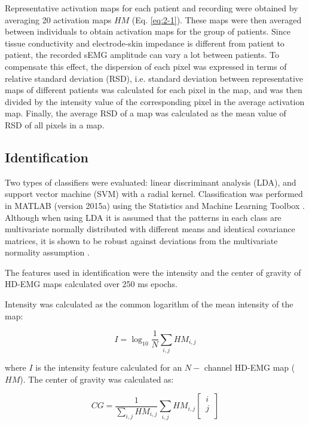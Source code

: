 Representative activation maps for each patient and recording were obtained by averaging 20 activation maps $HM$ (Eq. \ref{eq:2-1}). These maps were then averaged between individuals to obtain activation maps for the group of patients. Since tissue conductivity and electrode-skin impedance is different from patient to patient, the recorded sEMG amplitude can vary a lot between patients. To compensate this effect, the dispersion of each pixel was expressed in terms of relative standard deviation (RSD), i.e. standard deviation between representative maps of different patients was calculated for each pixel in the map, and was then divided by the intensity value of the corresponding pixel in the average activation map. Finally, the average RSD of a map was calculated as the mean value of RSD of all pixels in a map.



\subsection {Identification}

Two types of classifiers were evaluated: linear discriminant analysis (LDA), and support vector machine (SVM) with a radial kernel. Classification was performed in MATLAB (version 2015a) using the Statistics and Machine Learning Toolbox \citep{matlab}. Although when using LDA it is assumed that the patterns in each class are multivariate normally distributed with different means and identical covariance matrices, it is shown to be robust against deviations from the multivariate normality assumption \citep{Grouven1996}.

The features used in identification were the intensity and the center of gravity of HD-EMG maps calculated over 250 ms epochs.

Intensity was calculated as the common logarithm of the mean intensity of the map:

\begin{equation} \label{eq:2-2}
I = \log_{10} \frac{1}{N} \displaystyle\sum_{i,j} HM_{i,j}
\end{equation}

where $I$ is the intensity feature calculated for an $N-$ channel HD-EMG map ($HM$). The center of gravity was calculated as:

\begin{equation} \label{eq:2-3}
CG = \frac{1}{\sum_{i,j} HM_{i,j}}
\displaystyle\sum_{i,j} HM_{i,j} 
	\begin{bmatrix}
	  \, i \,\\
	  \, j \,\\
	  \end{bmatrix}
\end{equation}

